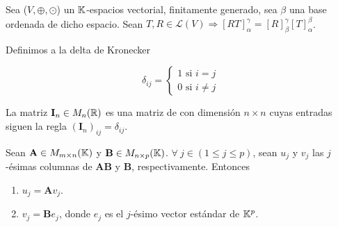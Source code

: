\begin{corollary}
    Sea ($V, \oplus, \odot$) un $\mathbb{K}$-espacios vectorial, finitamente generado, sea $\beta$ una base ordenada de dicho espacio. Sean $T,R \in \mathscr{L}(V) \Rightarrow [RT]_{\alpha}^{\gamma}=[R]_{\beta}^{\gamma}[T]_{\alpha}^{\beta}$.
\end{corollary}

\begin{definition} 
    Definimos a la delta de Kronecker 

    $$\delta_{ij} = \begin{cases}
        1 \text{ si } i = j \\
        0 \text{ si } i \neq j
    \end{cases}$$
    
    La matriz $\textbf{I}_{n} \in M_n(\mathbb{R})$ es una matriz de con dimensión $n\times n$ cuyas entradas siguen la regla $(\textbf{I}_n)_{ij}=\delta_{ij}$.
\end{definition}

\begin{theorem}
    \label{theom213fb}
    Sean $\textbf{A} \in M_{m\times n}(\mathbb{K})$ y $\textbf{B} \in M_{n \times p}(\mathbb{K})$. $\forall \: j \in (1 \leqslant j \leqslant p)$, sean $u_j$ y $v_j$ las $j$-ésimas columnas de $\textbf{AB}$ y $\textbf{B}$, respectivamente. Entonces 
    \begin{enumerate}
        \item $u_j=\textbf{A}v_j$.
        \item $v_j=\textbf{B}e_j$, donde $e_j$ es el $j$-ésimo vector estándar de $\mathbb{K}^p$.
    \end{enumerate}
\end{theorem}

